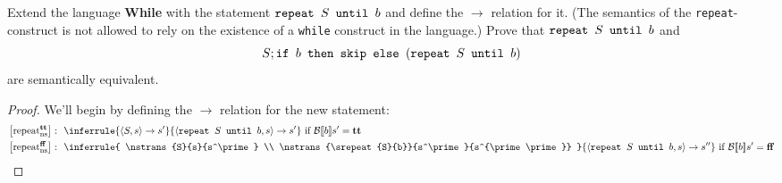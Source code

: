 Extend the language \textbf{While} with the statement $\texttt{repeat } S \texttt{ until } b$
and define the $\rightarrow$ relation for it. (The semantics of the \texttt{repeat}-construct is not allowed to rely on the existence of a \texttt{while} construct in the language.) Prove that $\texttt{repeat } S \texttt{ until } b$  and
\begin{equation*}
S; \texttt{if } b \texttt{ then } \texttt{skip} \texttt{ else } (\texttt{repeat } S \texttt{ until } b)
\end{equation*}
are semantically equivalent.

\begin{proof}
We'll begin by defining the $\rightarrow$ relation for the new statement:
\begin{align*}
\nsrule[\true]{repeat} : \ \ &
\inferrule
	{\nstrans{S}{s}{s^\prime}}
	{\nstrans{\srepeat{S}{b}}{s}{s^\prime}}
\text{ if } \beval{b}{s^\prime}=\true
\\
\nsrule[\false]{repeat} : \ \ &
\inferrule
	{
		\nstrans{S}{s}{s^\prime} \\
		\nstrans{\srepeat{S}{b}}{s^\prime}{s^{\prime\prime}}
	}
	{\nstrans{\srepeat{S}{b}}{s}{s^{\prime\prime}}}
\text{ if } \beval{b}{s^\prime}=\false
\end{align*}


\end{proof}
